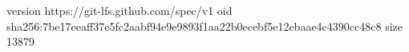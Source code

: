 version https://git-lfs.github.com/spec/v1
oid sha256:7be17eeaff37e5fc2aabf94e9e9893f1aa22b0ecebf5e12ebaae4c4390cc48c8
size 13879
